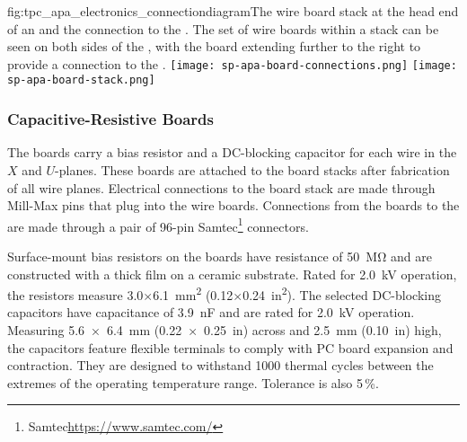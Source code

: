 \begin{dunefigure}{fig:tpc_apa_electronics_connectiondiagram}{The wire board stack at the head end of an  and the connection to the . The set of wire boards within a stack can be seen on both sides of the , with the  board extending further to the right to provide a connection to the .}
\texttt{[image: sp-apa-board-connections.png]}
\texttt{[image: sp-apa-board-stack.png]}
\end{dunefigure} 


\subsubsection{Capacitive-Resistive Boards}
\label{sec:crboards}

The  boards carry a bias resistor and a DC-blocking capacitor for each wire in the $X$ and $U$-planes. These boards are attached to the board stacks after fabrication of all wire planes.   Electrical connections to the board stack are made through Mill-Max pins that plug into the wire boards. Connections from the  boards to the  are made through a pair of \num{96}-pin Samtec\footnote{Samtec\texttrademark \url{https://www.samtec.com/}} connectors.

Surface-mount bias resistors on the  boards have resistance of \SI{50}{\mega\ohm} and are constructed with a thick film on a ceramic substrate. Rated for \SI{2.0}{kV} operation, the resistors measure \num{3.0}$\times$\SI{6.1}{mm^2} (\num{0.12}$\times$\SI{0.24}{in^2}). The selected DC-blocking capacitors have capacitance of \SI{3.9}{nF} and are rated for \SI{2.0}{kV} operation. Measuring %
\SI{5.6 x 6.4}{mm} (\SI{0.22 x 0.25}{in}) across and
\SI{2.5}{mm} (\SI{0.10}{in}) high,  
the capacitors feature flexible terminals to comply with PC board expansion and contraction. They are designed to withstand \num{1000} thermal cycles between the extremes of the operating temperature range. Tolerance is also \num{5}\,\%.

